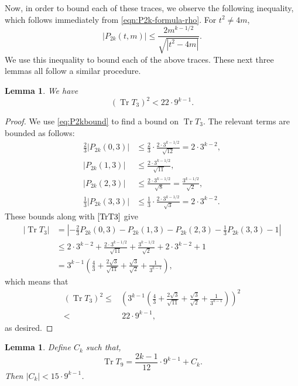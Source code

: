 \documentclass[11pt,letterpaper,reqno]{amsart}
\numberwithin{figure}{section}
\numberwithin{table}{section}
\theoremstyle{definition}
\theoremstyle{plain}
\newtheorem{lemma}[theorem]{Lemma}
\theoremstyle{definition}
\theoremstyle{definition}
\theoremstyle{remark}
\numberwithin{equation}{section}
\DeclareMathOperator{\Tr}{Tr}
\begin{document}
Now, in order to bound each of these traces, we observe the following inequality, which follows immediately from \eqref{eqn:P2k-formula-rho}. For $t^2\neq 4m$,
    \begin{equation}
        |P_{2k}(t, m)| \leq \frac{2m^{k - 1/2}}{\sqrt{|t^2 - 4m|}}\label{eq:P2kbound}.
    \end{equation}
We use this inequality to bound each of the above traces. These next three lemmas all follow a similar procedure.
\begin{lemma}\label{lemma:T3bound}
    We have
    \begin{equation}
        (\Tr T_3)^2 < 22 \cdot 9^{k-1}.
    \end{equation}
\end{lemma}
\begin{proof}
    We use \eqref{eq:P2kbound} to find a bound on $\Tr T_3$. 
The relevant terms are bounded as follows:
\begin{align}
    \frac{2}{3}\left|P_{2k}(0,3)\right|&\leq \frac{2}{3}\cdot\frac{2 \cdot 3^{k-1/2}}{\sqrt{12}}=2\cdot3^{k-2},\\
    \left|P_{2k}(1,3)\right|&\leq \frac{2\cdot3^{k-1/2}}{\sqrt{11}},\\
    \left|P_{2k}(2,3)\right|&\leq\frac{2\cdot3^{k-1/2}}{\sqrt{8}}=\frac{3^{k-1/2}}{\sqrt{2}},\\
    \frac{1}{3}\left|P_{2k}(3,3)\right|&\leq \frac{1}{3}\cdot\frac{2\cdot3^{k-1/2}}{\sqrt{3}}=2 \cdot 3^{k-2}.
\end{align}
These bounds along with $\eqref{TrT3}$ give
\begin{align}
    |\Tr T_3|&=\left|-\frac{2}{3}P_{2k}(0,3)-P_{2k}(1,3)-P_{2k}(2,3)-\frac{1}{3}P_{2k}(3,3)-1\right|\\
    &\leq2\cdot3^{k-2}+\frac{2\cdot3^{k-1/2}}{\sqrt{11}}+\frac{3^{k-1/2}}{\sqrt{2}}+2\cdot3^{k-2}+1\\
    &=3^{k-1}\left(\frac{4}{3}+\frac{2\sqrt{3}}{\sqrt{11}}+\frac{\sqrt{3}}{\sqrt{2}}+\frac{1}{3^{k-1}}\right),
\end{align}
which means that
\begin{align}
    (\Tr T_3)^2\leq&\left(3^{k-1}\left(\frac{4}{3}+\frac{2\sqrt{3}}{\sqrt{11}}+\frac{\sqrt{3}}{\sqrt{2}}+\frac{1}{3^{k-1}}\right)\right)^2\\
    <& \,22 \cdot 9^{k-1},
\end{align}
as desired.
\end{proof}
\begin{lemma}\label{lemma:TrT9}
    Define $C_k$ such that,
    \begin{equation}
        \Tr T_9 = \frac{2k-1}{12}\cdot 9^{k-1} +C_k.
    \end{equation}
    Then $|C_k|< 15\cdot 9^{k-1}$.
\end{lemma}
\end{document}
